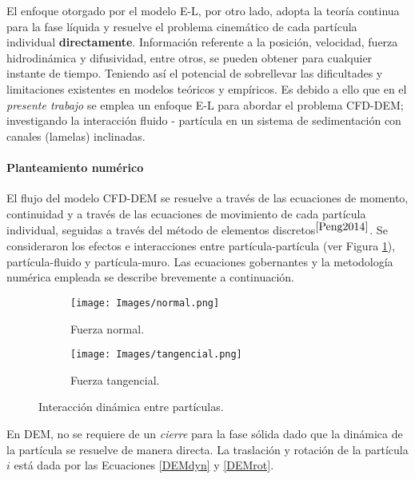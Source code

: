 \noindent
\justify

El enfoque otorgado por el modelo E-L, por otro lado, adopta la teor\'ia continua para la fase l\'iquida y resuelve el problema cinem\'atico de cada part\'icula individual \textbf{directamente}. Informaci\'on referente a la posici\'on, velocidad, fuerza hidrodin\'amica y difusividad, entre otros, se pueden obtener para cualquier instante de tiempo. Teniendo as\'i el potencial de sobrellevar las dificultades y limitaciones existentes en modelos te\'oricos y emp\'iricos. Es debido a ello que en el \textit{presente trabajo} se emplea un enfoque E-L para abordar el problema CFD-DEM; investigando la interacci\'on fluido - part\'icula en un sistema de sedimentaci\'on con canales (lamelas) inclinadas.

\paragraph{Planteamiento num\'erico}

\noindent
\justify

El flujo del modelo CFD-DEM se resuelve a trav\'es de las ecuaciones de momento, continuidad y a trav\'es de las ecuaciones de movimiento de cada part\'icula individual, seguidas a trav\'es del m\'etodo de elementos discretos$^{\cite{Peng2014}}$. Se consideraron los efectos e interacciones entre part\'icula-part\'icula (ver Figura \ref{particula}), part\'icula-fluido y part\'icula-muro. Las ecuaciones gobernantes y la metodolog\'ia num\'erica empleada se describe brevemente a continuaci\'on.

\begin{figure}[h!]
	\centering
	\begin{subfigure}[b]{0.4\textwidth}
		\texttt{[image: Images/normal.png]}
		\caption{Fuerza normal.}
	\end{subfigure}
	\hfill
	\begin{subfigure}[b]{0.4\textwidth}
		\texttt{[image: Images/tangencial.png]}
		\caption{Fuerza tangencial.}
	\end{subfigure}
	\caption{Interacci\'on din\'amica entre part\'iculas.}
	\label{particula}
\end{figure}

\noindent
\justify

En DEM, no se requiere de un \textit{cierre} para la fase s\'olida dado que la din\'amica de la part\'icula se resuelve de manera directa. La traslaci\'on y rotaci\'on de la part\'icula $i$ est\'a dada por las Ecuaciones \ref{DEMdyn} y \ref{DEMrot}.

